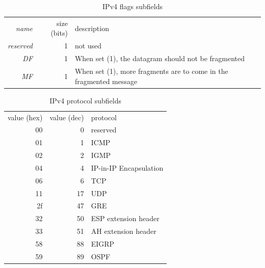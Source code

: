 \begin{table}
   \centering
   \begin{tabular}{rrl}
      \textit{name}     & size (bits) & description \\[1ex]
      \textit{reserved} & 1           & not used\\
      \textit{DF}       & 1           & When set (1), the datagram should not be fragmented\\
      \textit{MF}       & 1           & When set (1), more fragments are to come in the fragmented message\\
   \end{tabular}
   \caption{IPv4 flags subfields}
   \label{tab:ipv4-flags}
\end{table}


\begin{table}
   \centering
   \begin{tabular}{rrl}
      value (hex) & value (dec) & protocol\\[1ex]
      00 & 0 & reserved\\
      01 & 1 & ICMP\\
      02 & 2 & IGMP\\
      04 & 4 & IP-in-IP Encapsulation\\
      06 & 6 & TCP\\
      11 & 17 & UDP\\
      2f & 47 & GRE\\
      32 & 50 & ESP extension header\\
      33 & 51 & AH extension header\\
      58 & 88 & EIGRP \\
      59 & 89 & OSPF \\
   \end{tabular}
   \caption{IPv4 protocol subfields}
   \label{tab:ipv4-protocols}
\end{table}




